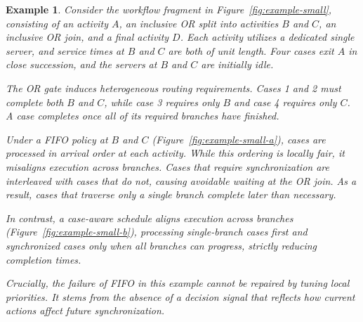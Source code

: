 \documentclass[letterpaper]{article}
\newtheorem{example}{Example}
\begin{document}
\begin{example}\label{ex:intro}
Consider the workflow fragment in Figure~\ref{fig:example-small}, consisting of an activity $A$, an inclusive OR split into activities $B$ and $C$, an inclusive OR join, and a final activity $D$. Each activity utilizes a dedicated single server, and service times at $B$ and $C$ are both of unit length. Four cases exit $A$ in close succession, and the servers at $B$ and $C$ are initially idle.

The OR gate induces heterogeneous routing requirements. Cases 1 and 2 must complete both $B$ and $C$, while case 3 requires only $B$ and case 4 requires only $C$. A case completes once all of its required branches have finished.

Under a FIFO policy at $B$ and $C$ (Figure~\ref{fig:example-small-a}), cases are processed in arrival order at each activity. While this ordering is locally fair, it misaligns execution across branches. Cases that require synchronization are interleaved with cases that do not, causing avoidable waiting at the OR join. As a result, cases that traverse only a single branch complete later than necessary.


In contrast, a case-aware schedule aligns execution across branches (Figure~\ref{fig:example-small-b}), processing single-branch cases first and synchronized cases only
when all branches can progress, strictly reducing completion times.

Crucially, the failure of FIFO in this example cannot be repaired by tuning local priorities. It stems from the absence of a decision signal that reflects how current actions affect future synchronization.
\end{example} 
\end{document}
